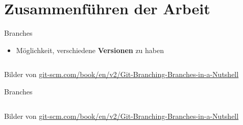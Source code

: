 \documentclass{beamer}
\begin{document}
  \section{Zusammenführen der Arbeit}


    \begin{frame}{Branches}
      \begin{itemize}
        \item<+> Möglichkeit, verschiedene \textbf{Versionen} zu haben
      \end{itemize}
      \begin{columns}
       \end{columns}
      \tiny{Bilder von \url{git-scm.com/book/en/v2/Git-Branching-Branches-in-a-Nutshell}}
    \end{frame}

    \begin{frame}{Branches}

      \begin{columns}
      \end{columns}
    \tiny{Bilder von \url{git-scm.com/book/en/v2/Git-Branching-Branches-in-a-Nutshell}}
    \end{frame}
\end{document}

